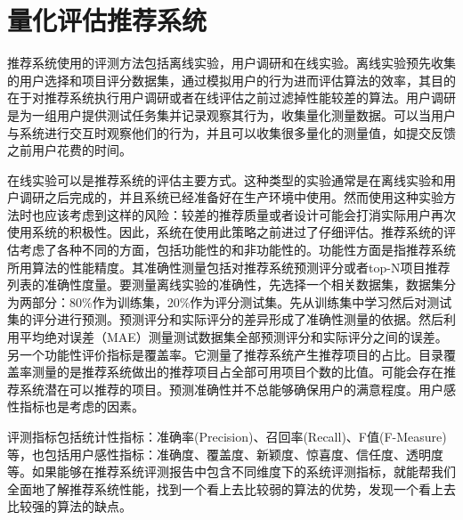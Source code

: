   \section{量化评估推荐系统}
  推荐系统使用的评测方法包括离线实验，用户调研和在线实验。离线实验预先收集的用户选择和项目评分数据集，通过模拟用户的行为进而评估算法的效率，其目的在于对推荐系统执行用户调研或者在线评估之前过滤掉性能较差的算法。用户调研是为一组用户提供测试任务集并记录观察其行为，收集量化测量数据。可以当用户与系统进行交互时观察他们的行为，并且可以收集很多量化的测量值，如提交反馈之前用户花费的时间。

  在线实验可以是推荐系统的评估主要方式。这种类型的实验通常是在离线实验和用户调研之后完成的，并且系统已经准备好在生产环境中使用。然而使用这种实验方法时也应该考虑到这样的风险：较差的推荐质量或者设计可能会打消实际用户再次使用系统的积极性。因此，系统在使用此策略之前进过了仔细评估。推荐系统的评估考虑了各种不同的方面，包括功能性的和非功能性的。功能性方面是指推荐系统所用算法的性能精度。其准确性测量包括对推荐系统预测评分或者top-N项目推荐列表的准确性度量。要测量离线实验的准确性，先选择一个相关数据集，数据集分为两部分：80\%作为训练集，20\%作为评分测试集。先从训练集中学习然后对测试集的评分进行预测。预测评分和实际评分的差异形成了准确性测量的依据。然后利用平均绝对误差（MAE）测量测试数据集全部预测评分和实际评分之间的误差。另一个功能性评价指标是覆盖率。它测量了推荐系统产生推荐项目的占比。目录覆盖率测量的是推荐系统做出的推荐项目占全部可用项目个数的比值。可能会存在推荐系统潜在可以推荐的项目。预测准确性并不总能够确保用户的满意程度。用户感性指标也是考虑的因素。

  评测指标包括统计性指标：准确率(Precision)、召回率(Recall)、F值(F-Measure)等，也包括用户感性指标：准确度、覆盖度、新颖度、惊喜度、信任度、透明度等。如果能够在推荐系统评测报告中包含不同维度下的系统评测指标，就能帮我们全面地了解推荐系统性能，找到一个看上去比较弱的算法的优势，发现一个看上去比较强的算法的缺点。

